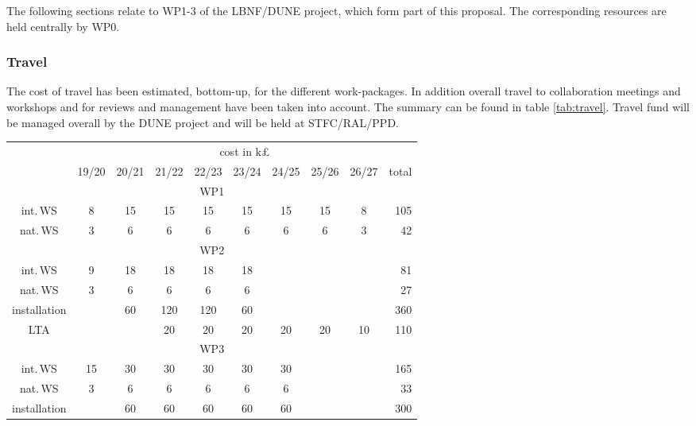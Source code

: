 The following sections relate to WP1-3 of the LBNF/DUNE project, which form part of this proposal. The corresponding resources are held centrally by WP0.

\subsubsection{Travel}
The cost of travel has been estimated, bottom-up, for the different work-packages. In addition overall travel to collaboration meetings and workshops and for reviews and management have been taken into account. The summary can be found in table \ref{tab:travel}. Travel fund will be managed overall by the DUNE project and will be held at STFC/RAL/PPD. 
\begin{table}[htb]
    \centering
    \begin{tabular}{|c||c|c|c|c|c|c|c|c||r|}
        \cline{2-10} \multicolumn{1}{c|}{\ } & \multicolumn{9}{c|}{cost in k£}\\
         \cline{2-10}
         \multicolumn{1}{c|}{\ } & 19/20 & 20/21 & 21/22 & 22/23 & 23/24 & 24/25 & 25/26 & 26/27 & total\\
         \cline{2-10}\hline
        \multicolumn{10}{|c|}{WP1 }\\
         \hline
         int.\,WS       & 8 & 15  & 15  &  15 & 15  & 15  & 15 & 8 & 105  \\
         nat.\,WS       & 3 & 6   & 6   & 6   & 6   & 6   &  6 & 3 & 42 \\
         \hline\hline
         \multicolumn{10}{|c|}{WP2 }\\
         \cline{1-10}
         int.\,WS      &  9  & 18  & 18  & 18  & 18  &     &    &    & 81  \\
         nat.\,WS      &   3 & 6   &  6  & 6   &   6 &     &    &    & 27  \\
         installation  &     & 60  & 120 & 120 & 60  &     &    &    & 360  \\
         LTA           &     &     & 20  & 20  & 20  &  20 & 20 & 10 & 110  \\
         \hline\hline
         \multicolumn{10}{|c|}{WP3 }\\
         \cline{1-10}
         int.\,WS      &  15 & 30  & 30  & 30  & 30  & 30  &    & & 165  \\
         nat.\,WS      &   3 &  6  &  6  & 6   &  6  &  6  &    & & 33  \\
         installation  &     & 60  & 60  & 60  & 60  &  60 &    & & 300  \\

\end{tabular}
\end{table}
